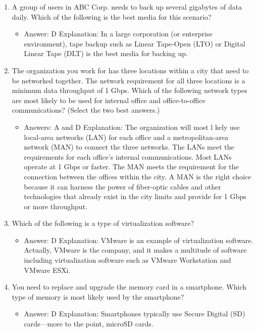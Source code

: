 \documentclass{article}
\begin{document}
\begin{enumerate}
    \item A group of users in ABC Corp. needs to back up several gigabytes of
data daily. Which of the following is the best media for this scenario?
    \begin{itemize}
        \item Answer: D
Explanation: In a large corporation (or enterprise environment), tape backup such as
Linear Tape-Open (LTO) or Digital Linear Tape (DLT) is the best media for backing up.
    \end{itemize}
    \item  The organization you work for has three locations within a city that
need to be networked together. The network requirement for all three
locations is a minimum data throughput of 1 Gbps. Which of the
following network types are most likely to be used for internal office
and office-to-office communications? (Select the two best answers.)
    \begin{itemize}
        \item Answers: A and D
Explanation: The organization will most l kely use local-area networks (LAN) for each office
and a metropolitan-area network (MAN) to connect the three networks. The LANs meet
the requirements for each office’s internal communications. Most LANs operate at 1 Gbps
or faster. The MAN meets the requirement for the connection between the offices within
the city. A MAN is the right choice because it can harness the power of fiber-optic cables
and other technologies that already exist in the city limits and provide for 1 Gbps or more
throughput.
    \end{itemize}
    \item Which of the following is a type of virtualization software?
    \begin{itemize}
        \item Answer: D
Explanation: VMware is an example of virtualization software. Actually, VMware is the
company, and it makes a multitude of software including virtualization software such
as VMware Workstation and VMware ESXi.
    \end{itemize}
    \item You need to replace and upgrade the memory card in a
smartphone. Which type of memory is most likely used by the
smartphone?
    \begin{itemize}
        \item Answer: D
Explanation: Smartphones typically use Secure Digital (SD) cards—more to the point,
microSD cards.
    \end{itemize}

\end{enumerate}
\end{document}
